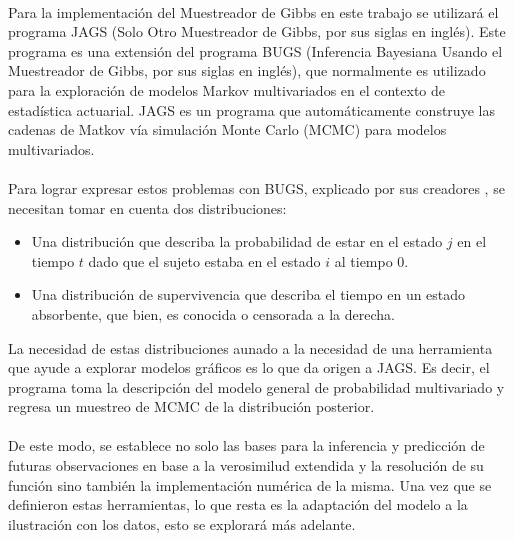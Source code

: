 \\
Para la implementaci\'on del Muestreador de Gibbs en este trabajo se utilizar\'a el programa JAGS (Solo Otro Muestreador de Gibbs, por sus siglas en ingl\'es). Este programa es una extensi\'on del programa BUGS (Inferencia Bayesiana Usando el Muestreador de Gibbs, por sus siglas en ingl\'es), que normalmente es utilizado para la exploraci\'on de modelos Markov multivariados en el contexto de estad\'istica actuarial. JAGS es un programa que autom\'aticamente construye las cadenas de Matkov v\'ia simulaci\'on Monte Carlo (MCMC) para modelos multivariados.\\
\\
Para lograr expresar estos problemas con BUGS, explicado por sus creadores \cite{plummer2003jags}, se necesitan tomar en cuenta dos distribuciones:
\begin{itemize}
\item Una distribuci\'on que describa la probabilidad de estar en el estado $j$ en el tiempo $t$ dado que el sujeto estaba en el estado $i$ al tiempo $0$.
\item Una distribuci\'on de supervivencia que describa el tiempo en un estado absorbente, que bien, es conocida o censorada a la derecha.
\end{itemize}
La necesidad de estas distribuciones aunado a la necesidad de una herramienta que ayude a explorar modelos gr\'aficos es lo que da origen a JAGS. Es decir, el programa toma la descripci\'on del modelo general de probabilidad multivariado y regresa un muestreo de MCMC de la distribuci\'on posterior.\\
\\
De este modo, se establece no solo las bases para la inferencia y predicci\'on de futuras observaciones en base a la verosimilud extendida y la resoluci\'on de su funci\'on sino tambi\'en la implementaci\'on num\'erica de la misma. Una vez que se definieron estas herramientas, lo que resta es la adaptaci\'on del modelo a la ilustraci\'on con los datos, esto se explorar\'a m\'as adelante.